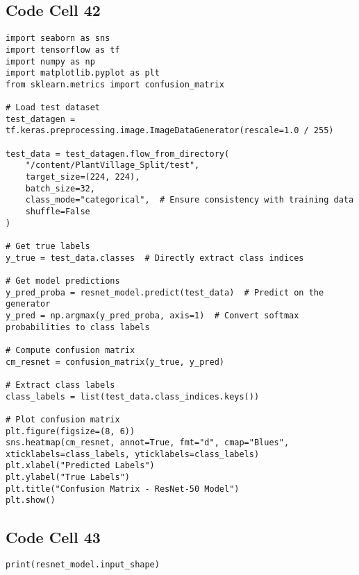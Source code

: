 \documentclass{article}
\begin{document}
\subsection*{Code Cell 42}
\begin{lstlisting}
import seaborn as sns
import tensorflow as tf
import numpy as np
import matplotlib.pyplot as plt
from sklearn.metrics import confusion_matrix

# Load test dataset
test_datagen = tf.keras.preprocessing.image.ImageDataGenerator(rescale=1.0 / 255)

test_data = test_datagen.flow_from_directory(
    "/content/PlantVillage_Split/test",
    target_size=(224, 224),
    batch_size=32,
    class_mode="categorical",  # Ensure consistency with training data
    shuffle=False
)

# Get true labels
y_true = test_data.classes  # Directly extract class indices

# Get model predictions
y_pred_proba = resnet_model.predict(test_data)  # Predict on the generator
y_pred = np.argmax(y_pred_proba, axis=1)  # Convert softmax probabilities to class labels

# Compute confusion matrix
cm_resnet = confusion_matrix(y_true, y_pred)

# Extract class labels
class_labels = list(test_data.class_indices.keys())

# Plot confusion matrix
plt.figure(figsize=(8, 6))
sns.heatmap(cm_resnet, annot=True, fmt="d", cmap="Blues", xticklabels=class_labels, yticklabels=class_labels)
plt.xlabel("Predicted Labels")
plt.ylabel("True Labels")
plt.title("Confusion Matrix - ResNet-50 Model")
plt.show()
\end{lstlisting}

\subsection*{Code Cell 43}
\begin{lstlisting}
print(resnet_model.input_shape)

\end{lstlisting}
\end{document}
